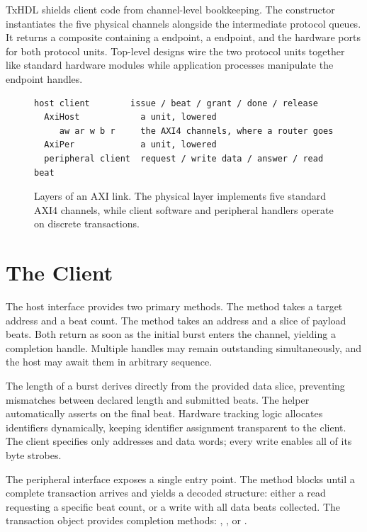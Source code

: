 \documentclass[journal,9pt]{IEEEtran}
\newcommand{\axipart}[3]{%
}
\begin{document}
TxHDL shields client code from channel-level bookkeeping. The 
constructor instantiates the five physical channels alongside the
intermediate protocol queues. It returns a composite  containing
a  endpoint, a  endpoint, and the hardware ports for
both protocol units. Top-level designs wire the two protocol units together
like standard hardware modules while application processes manipulate the
endpoint handles.

\begin{figure}[htbp]
\centering
\begin{lstlisting}[style=ascii,frame=none,numbers=none]
  host client        issue / beat / grant / done / release
  AxiHost            a unit, lowered
     aw ar w b r     the AXI4 channels, where a router goes
  AxiPer             a unit, lowered
  peripheral client  request / write data / answer / read beat
\end{lstlisting}
\caption{Layers of an AXI link. The physical layer implements five standard
AXI4 channels, while client software and peripheral handlers operate on
discrete transactions.}
\label{fig:a-layers}
\end{figure}

\section{The Client}
\label{sec:a-client}

The host interface provides two primary methods. The  method
takes a target address and a beat count. The  method takes an
address and a slice of payload beats. Both return as soon as the initial
burst enters the channel, yielding a completion handle. Multiple handles
may remain outstanding simultaneously, and the host may await them in
arbitrary sequence.

\axipart{hostapi}{The host endpoint interface from
\code{lib/parts/src/bus/axi.rs}.}{lst:a-hostapi}

The length of a burst derives directly from the provided data slice,
preventing mismatches between declared length and submitted beats. The
 helper automatically asserts  on the final beat.
Hardware tracking logic allocates identifiers dynamically, keeping
identifier assignment transparent to the client. The client specifies only
addresses and data words; every write enables all of its byte strobes.

The peripheral interface exposes a single entry point. The 
method blocks until a complete transaction arrives and yields a decoded
structure: either a read requesting a specific beat count, or a write with
all data beats collected. The transaction object provides completion
methods: , , or .
\end{document}
